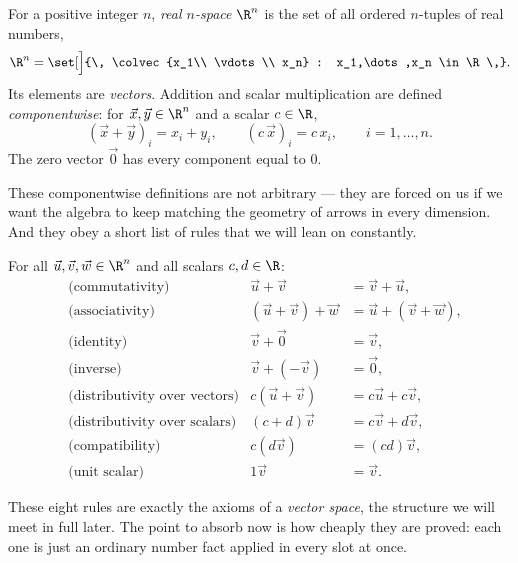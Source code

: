 \begin{formalbox}
\begin{definition}
\label{ch02:def-rn}
For a positive integer $n$, \emph{real $n$-space} $\R^n$ is the set of all ordered
$n$-tuples of real numbers,
\[
  \R^n = \set[\Big]{\, \colvec{x_1\\ \vdots \\ x_n} : x_1,\dots,x_n \in \R \,}.
\]
Its elements are \emph{vectors}. Addition and scalar multiplication are defined
\emph{componentwise}: for $\vec{x},\vec{y}\in\R^n$ and a scalar $c\in\R$,
\[
  (\vec{x}+\vec{y})_i = x_i + y_i,
  \qquad
  (c\,\vec{x})_i = c\,x_i,
  \qquad i = 1,\dots,n.
\]
The zero vector $\vec{0}$ has every component equal to $0$.
\end{definition}
\end{formalbox}

These componentwise definitions are not arbitrary --- they are forced on us if we want
the algebra to keep matching the geometry of arrows in every dimension. And they obey a
short list of rules that we will lean on constantly.

\begin{formalbox}
\begin{proposition}
\label{ch02:prop-axioms}
For all $\vec{u},\vec{v},\vec{w}\in\R^n$ and all scalars $c,d\in\R$:
\begin{align*}
  &\text{(commutativity)} & \vec{u}+\vec{v} &= \vec{v}+\vec{u}, \\
  &\text{(associativity)} & (\vec{u}+\vec{v})+\vec{w} &= \vec{u}+(\vec{v}+\vec{w}), \\
  &\text{(identity)} & \vec{v}+\vec{0} &= \vec{v}, \\
  &\text{(inverse)} & \vec{v}+(-\vec{v}) &= \vec{0}, \\
  &\text{(distributivity over vectors)} & c(\vec{u}+\vec{v}) &= c\vec{u}+c\vec{v}, \\
  &\text{(distributivity over scalars)} & (c+d)\vec{v} &= c\vec{v}+d\vec{v}, \\
  &\text{(compatibility)} & c(d\vec{v}) &= (cd)\vec{v}, \\
  &\text{(unit scalar)} & 1\vec{v} &= \vec{v}.
\end{align*}
\end{proposition}
\end{formalbox}

These eight rules are exactly the axioms of a \emph{vector space}, the structure we will
meet in full later. The point to absorb now is how cheaply they are proved: each one is
just an ordinary number fact applied in every slot at once.

